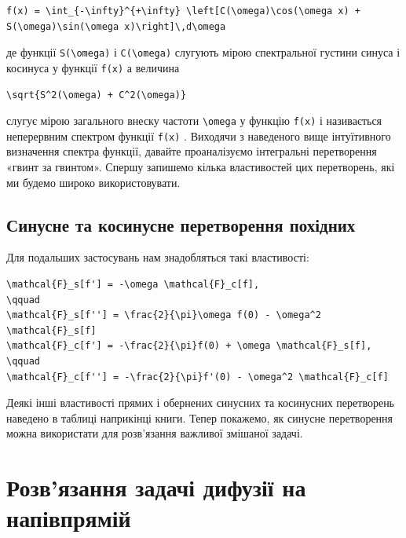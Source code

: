 \documentclass[
  ukrainian,
]{article}
\begin{document}
\begin{verbatim}
f(x) = \int_{-\infty}^{+\infty} \left[C(\omega)\cos(\omega x) + S(\omega)\sin(\omega x)\right]\,d\omega
\end{verbatim}

де функції \texttt{S(\textbackslash{}omega)} і
\texttt{C(\textbackslash{}omega)} слугують мірою спектральної густини
синуса і косинуса у функції \texttt{f(x)} а величина

\begin{verbatim}
\sqrt{S^2(\omega) + C^2(\omega)}
\end{verbatim}

слугує мірою загального внеску частоти \texttt{\textbackslash{}omega} у
функцію \texttt{f(x)} і називається неперервним спектром функції
\texttt{f(x)} . Виходячи з наведеного вище інтуїтивного визначення
спектра функції, давайте проаналізуємо інтегральні перетворення «гвинт
за гвинтом». Спершу запишемо кілька властивостей цих перетворень, які ми
будемо широко використовувати.

\subsection{Синусне та косинусне перетворення
похідних}\label{ux441ux438ux43dux443ux441ux43dux435-ux442ux430-ux43aux43eux441ux438ux43dux443ux441ux43dux435-ux43fux435ux440ux435ux442ux432ux43eux440ux435ux43dux43dux44f-ux43fux43eux445ux456ux434ux43dux438ux445}

Для подальших застосувань нам знадобляться такі властивості:

\begin{verbatim}
\mathcal{F}_s[f'] = -\omega \mathcal{F}_c[f],
\qquad
\mathcal{F}_s[f''] = \frac{2}{\pi}\omega f(0) - \omega^2 \mathcal{F}_s[f]
\mathcal{F}_c[f'] = -\frac{2}{\pi}f(0) + \omega \mathcal{F}_s[f],
\qquad
\mathcal{F}_c[f''] = -\frac{2}{\pi}f'(0) - \omega^2 \mathcal{F}_c[f]
\end{verbatim}

Деякі інші властивості прямих і обернених синусних та косинусних
перетворень наведено в таблиці наприкінці книги. Тепер покажемо, як
синусне перетворення можна використати для розв'язання важливої змішаної
задачі.

\section{Розв'язання задачі дифузії на
напівпрямій}\label{ux440ux43eux437ux432ux44fux437ux430ux43dux43dux44f-ux437ux430ux434ux430ux447ux456-ux434ux438ux444ux443ux437ux456ux457-ux43dux430-ux43dux430ux43fux456ux432ux43fux440ux44fux43cux456ux439}
\end{document}
